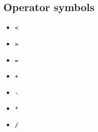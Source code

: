 \subsection{Operator symbols}
\begin{multicols}{7}
    \begin{itemize}
        \item \verb|<|
        \item \verb|>|
        \item \verb|=|
        \item \verb|+|
        \item \verb|-|
        \item \verb|*|
        \item \verb|/|
    \end{itemize}
\end{multicols}
